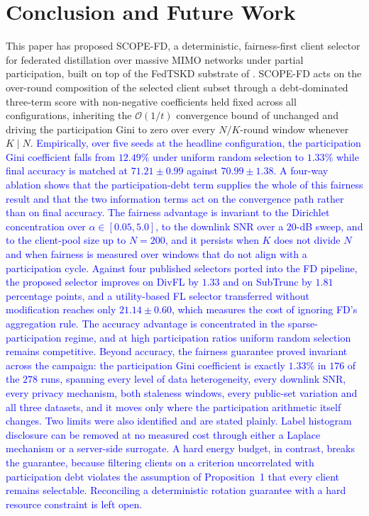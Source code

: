 \documentclass[journal]{IEEEtran}
\newcommand{\revIVE}[1]{#1}
\newcommand{\rev}[1]{\textcolor{blue}{#1}}
\begin{document}
\section{Conclusion and Future Work}
\label{sec:conclusion}
This paper has proposed SCOPE-FD, a deterministic, fairness-first client selector for federated distillation over massive MIMO networks under partial participation, built on top of the FedTSKD substrate of \cite{mu2024fedtskd}. SCOPE-FD acts on the over-round composition of the selected client subset through a debt-dominated three-term score with non-negative coefficients held fixed across all configurations, inheriting the $\mathcal{O}(1/t)$ convergence bound of \cite{mu2024fedtskd} unchanged and \revIVE{driving the participation Gini to zero over every $N/K$-round window whenever $K \mid N$}. \rev{Empirically, over five seeds at the headline configuration, the participation Gini coefficient falls from $12.49\%$ under uniform random selection to $1.33\%$ while final accuracy is matched at $71.21 \pm 0.99$ against $70.99 \pm 1.38$. A four-way ablation shows that the participation-debt term supplies the whole of this fairness result and that the two information terms act on the convergence path rather than on final accuracy. The fairness advantage is invariant to the Dirichlet concentration over $\alpha \in [0.05, 5.0]$, to the downlink SNR over a $20$-dB sweep, and to the client-pool size up to $N = 200$, and it persists when $K$ does not divide $N$ and when fairness is measured over windows that do not align with a participation cycle. Against four published selectors ported into the FD pipeline, the proposed selector improves on DivFL by $1.33$ and on SubTrunc by $1.81$ percentage points, and a utility-based FL selector transferred without modification reaches only $21.14 \pm 0.60$, which measures the cost of ignoring FD's aggregation rule. The accuracy advantage is concentrated in the sparse-participation regime, and at high participation ratios uniform random selection remains competitive. Beyond accuracy, the fairness guarantee proved invariant across the campaign: the participation Gini coefficient is exactly $1.33\%$ in $176$ of the $278$ runs, spanning every level of data heterogeneity, every downlink SNR, every privacy mechanism, both staleness windows, every public-set variation and all three datasets, and it moves only where the participation arithmetic itself changes. Two limits were also identified and are stated plainly. Label histogram disclosure can be removed at no measured cost through either a Laplace mechanism or a server-side surrogate. A hard energy budget, in contrast, breaks the guarantee, because filtering clients on a criterion uncorrelated with participation debt violates the assumption of Proposition~1 that every client remains selectable. Reconciling a deterministic rotation guarantee with a hard resource constraint is left open.}
\end{document}
